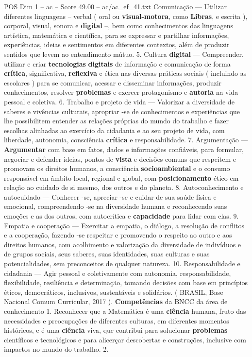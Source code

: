 \begin{textsample}{POS Dim 1 – ac – Score 49.00 – ac/ac\_ef\_41.txt}
Comunicação — Utilizar diferentes linguagens – verbal ( oral ou \textbf{visual-motora}, como \textbf{Libras}, e escrita ), corporal, visual, sonora e \textbf{digital} –, bem como conhecimentos das linguagens artística, matemática e científica, para se expressar e partilhar informações, experiências, ideias e sentimentos em diferentes contextos, além de produzir sentidos que levem ao entendimento mútuo. 5.
Cultura \textbf{digital} — Compreender, utilizar e criar \textbf{tecnologias} \textbf{digitais} de informação e comunicação de forma \textbf{crítica}, significativa, \textbf{reflexiva} e ética nas diversas práticas sociais ( incluindo as escolares ) para se comunicar, acessar e disseminar informações, produzir conhecimentos, resolver \textbf{problemas} e exercer protagonismo e \textbf{autoria} na vida pessoal e coletiva. 6.
Trabalho e projeto de vida — Valorizar a diversidade de saberes e vivências culturais, apropriar -se de conhecimentos e experiências que lhe possibilitem entender as relações próprias do mundo do trabalho e fazer escolhas alinhadas ao exercício da cidadania e ao seu projeto de vida, com liberdade, autonomia, consciência \textbf{crítica} e responsabilidade. 7.
Argumentação — \textbf{Argumentar} com base em fatos, dados e informações confiáveis, para formular, negociar e defender ideias, pontos de \textbf{vista} e decisões comuns que respeitem e promovam os direitos humanos, a consciência \textbf{socioambiental} e o consumo responsável em âmbito local, regional e global, com \textbf{posicionamento} ético em relação ao cuidado de si mesmo, dos outros e do planeta. 8.
Autoconhecimento e autocuidado — Conhecer -se, apreciar -se e cuidar de sua saúde física e emocional, compreendendo -se na diversidade humana e reconhecendo suas emoções e as dos outros, com autocrítica e \textbf{capacidade} para lidar com elas. 9.
Empatia e cooperação — Exercitar a empatia, o diálogo, a resolução de conflitos e a cooperação, fazendo -se respeitar e promovendo o respeito ao outro e aos direitos humanos, com acolhimento e valorização da diversidade de indivíduos e de grupos sociais, seus saberes, suas identidades, suas culturas e suas potencialidades, sem preconceitos de qualquer natureza. 10.
Responsabilidade e cidadania — Agir pessoal e coletivamente com autonomia, responsabilidade, flexibilidade, resiliência e determinação, tomando decisões com base em princípios éticos, democráticos, inclusivos, sustentáveis e solidários. ( BRASIL, Base Nacional Comum Curricular, 2017 ). \textbf{Competências} da BNCC da área de conhecimento 1.
Reconhecer que a Matemática é uma \textbf{ciência} humana, fruto das necessidades e preocupações de diferentes culturas, em diferentes momentos históricos, e é uma \textbf{ciência} viva, que contribui para solucionar \textbf{problemas} científicos e tecnológicos e para alicerçar descobertas e construções, inclusive com impactos no mundo do trabalho. 2.

\end{textsample}
